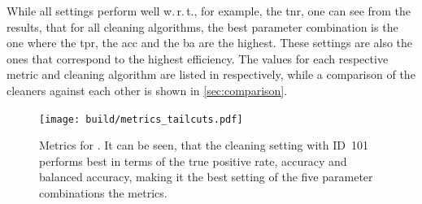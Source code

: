 While all settings perform well w.\,r.\,t., for example, the \gls{tnr}, one can see from the results, that for all cleaning
algorithms, the best parameter combination is the one where the \gls{tpr}, the \gls{acc} and the \gls{ba}
are the highest. These settings are also the ones that correspond to the highest efficiency.
The values for each respective metric and cleaning algorithm are listed in
 respectively, while
a comparison of the cleaners against each other is shown in \autoref{sec:comparison}.
\begin{table}
    \centering
    \caption{Results for the metrics of \tailcuts{}. One can see, that the best results are obtained
    for the setting with ID~101.}%
    \label{tab:metrics_tail}
\end{table}

\begin{figure}
    \centering
    \texttt{[image: build/metrics\_tailcuts.pdf]}
    \caption{Metrics for \tailcuts{}. It can be seen, that the cleaning setting with ID~101 performs
    best in terms of the true positive rate, accuracy and balanced accuracy, making it the best
    setting of the five parameter combinations \wrt the metrics.}%
    \label{fig:metrics_tail}
\end{figure}

